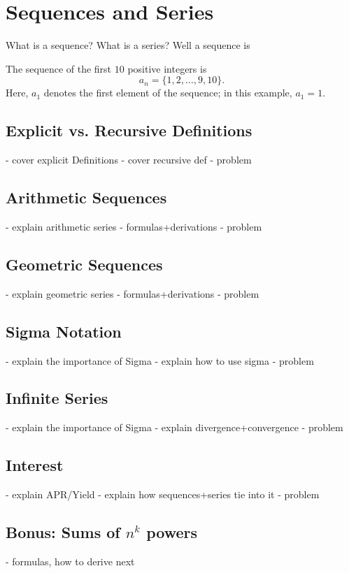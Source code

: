 \chapter{Sequences and Series}
What is a sequence? What is a series? Well a sequence is 
\begin{example}
    The sequence of the first $10$ positive integers is
    \[a_n=\{1,2,\dots,9,10\}.\]
    Here, $a_1$ denotes the first element of the sequence; in this example, $a_1=1$.
\end{example}
\section{Explicit vs. Recursive Definitions}
- cover explicit Definitions
- cover recursive def 
- problem
\section{Arithmetic Sequences}
- explain arithmetic series
- formulas+derivations
- problem
\section{Geometric Sequences}
- explain geometric series
- formulas+derivations
- problem
\section{Sigma Notation}
- explain the importance of Sigma
- explain how to use sigma
- problem
\section{Infinite Series}
- explain the importance of Sigma
- explain divergence+convergence
- problem
\section{Interest}
- explain APR/Yield
- explain how sequences+series tie into it
- problem 

\begin{subappendices}
\section{Bonus: Sums of $n^k$ powers}
    - formulas, how to derive next
\end{subappendices}